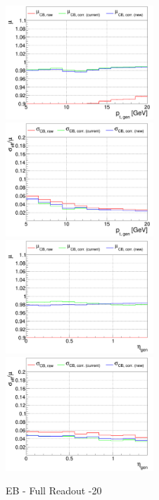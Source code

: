 \begin{figure}
\includegraphics[width=0.495\textwidth]{./plots_pdf/ECAL_plots/plotsPU/EB/FULL/pdf/GENPT/EBFULL_GENPT_0005_0020_MuOverBins.pdf}
\includegraphics[width=0.495\textwidth]{./plots_pdf/ECAL_plots/plotsPU/EB/FULL/pdf/GENPT/EBFULL_GENPT_0005_0020_EffSigmaOverBins.pdf}
\includegraphics[width=0.495\textwidth]{./plots_pdf/ECAL_plots/plotsPU/EB/FULL/pdf/GENETA/EBFULL_GENETA_0005_0020_MuOverBins.pdf}
\includegraphics[width=0.495\textwidth]{./plots_pdf/ECAL_plots/plotsPU/EB/FULL/pdf/GENETA/EBFULL_GENETA_0005_0020_EffSigmaOverBins.pdf}
\caption{EB - Full Readout -20}



\end{figure}
